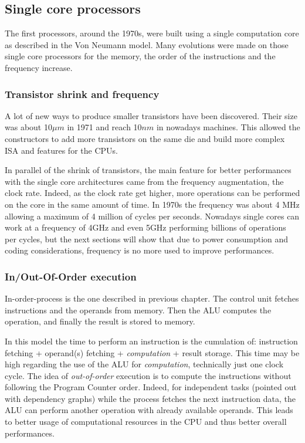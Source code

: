 \subsection{Single core processors}
The first processors, around the 1970s, were built using a single computation core as described in the Von Neumann model. 
Many evolutions were made on those single core processors for the memory, the order of the instructions and the frequency increase.

\subsubsection{Transistor shrink and frequency}
A lot of new ways to produce smaller transistors have been discovered.
Their size was about 10$\mu m$ in 1971 and reach 10$nm$ in nowadays machines.
This allowed the constructors to add more transistors on the same die and build more complex ISA and features for the CPUs. 

In parallel of the shrink of transistors, the main feature for better performances with the single core architectures came from the frequency augmentation, the clock rate. 
Indeed, as the clock rate get higher, more operations can be performed on the core in the same amount of time. 
In 1970s the frequency was about 4 MHz allowing a maximum of 4 million of cycles per seconds. 
Nowadays single cores can work at a frequency of 4GHz and even 5GHz performing billions of operations per cycles, but the next sections will show that due to power consumption and coding considerations, frequency is no more used to improve performances. 

\subsubsection{In/Out-Of-Order execution} 
In-order-process is the one described in previous chapter. 
The control unit fetches instructions and the operands from memory. Then the ALU computes the operation, and finally the result is stored to memory.

In this model the time to perform an instruction is the cumulation of: instruction fetching + operand(s) fetching + \textit{computation} + result storage.
This time may be high regarding the use of the ALU for \textit{computation}, technically just one clock cycle. 
The idea of \textit{out-of-order} execution is to compute the instructions without following the Program Counter order. 
Indeed, for independent tasks (pointed out with dependency graphs) while the process fetches the next instruction data, the ALU can perform another operation with already available operands.
This leads to better usage of computational resources in the CPU and thus better overall performances. 

